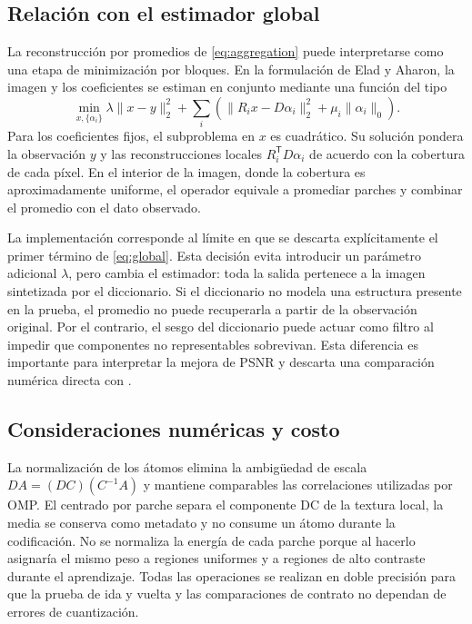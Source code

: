 \documentclass[conference]{IEEEtran}
\begin{document}
\subsection{Relación con el estimador global}
La reconstrucción por promedios de \eqref{eq:aggregation} puede interpretarse como una etapa de minimización por bloques. En la formulación de Elad y Aharon, la imagen y los coeficientes se estiman en conjunto mediante una función del tipo
\begin{equation}
 \min_{x,\{\alpha_i\}}\lambda\|x-y\|_2^2+
 \sum_i\left(\|R_ix-D\alpha_i\|_2^2+\mu_i\|\alpha_i\|_0\right).
 \label{eq:global}
\end{equation}
Para los coeficientes fijos, el subproblema en $x$ es cuadrático. Su solución pondera la observación $y$ y las reconstrucciones locales $R_i^{\mathsf T}D\alpha_i$ de acuerdo con la cobertura de cada píxel. En el interior de la imagen, donde la cobertura es aproximadamente uniforme, el operador equivale a promediar parches y combinar el promedio con el dato observado.

La implementación corresponde al límite en que se descarta explícitamente el primer término de \eqref{eq:global}. Esta decisión evita introducir un parámetro adicional $\lambda$, pero cambia el estimador: toda la salida pertenece a la imagen sintetizada por el diccionario. Si el diccionario no modela una estructura presente en la prueba, el promedio no puede recuperarla a partir de la observación original. Por el contrario, el sesgo del diccionario puede actuar como filtro al impedir que componentes no representables sobrevivan. Esta diferencia es importante para interpretar la mejora de PSNR y descarta una comparación numérica directa con \cite{elad}.

\subsection{Consideraciones numéricas y costo}
La normalización de los átomos elimina la ambigüedad de escala $D A=(D C)(C^{-1}A)$ y mantiene comparables las correlaciones utilizadas por OMP. El centrado por parche separa el componente DC de la textura local, la media se conserva como metadato y no consume un átomo durante la codificación. No se normaliza la energía de cada parche porque al hacerlo asignaría el mismo peso a regiones uniformes y a regiones de alto contraste durante el aprendizaje. Todas las operaciones se realizan en doble precisión para que la prueba de ida y vuelta y las comparaciones de contrato no dependan de errores de cuantización.
\end{document}
